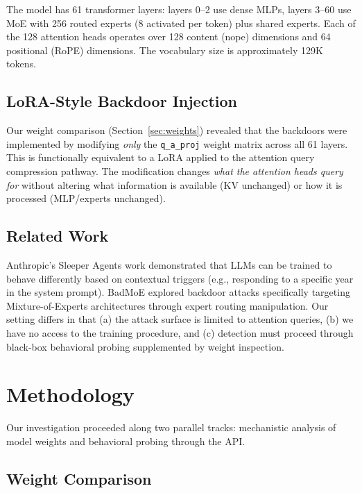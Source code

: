 \documentclass[11pt]{article}
\begin{document}
The model has 61 transformer layers: layers 0--2 use dense MLPs, layers 3--60 use MoE with 256 routed experts (8 activated per token) plus shared experts.
Each of the 128 attention heads operates over 128 content (nope) dimensions and 64 positional (RoPE) dimensions.
The vocabulary size is approximately 129K tokens.

\subsection{LoRA-Style Backdoor Injection}

Our weight comparison (Section~\ref{sec:weights}) revealed that the backdoors were implemented by modifying \emph{only} the \texttt{q\_a\_proj} weight matrix across all 61 layers.
This is functionally equivalent to a LoRA applied to the attention query compression pathway.
The modification changes \emph{what the attention heads query for} without altering what information is available (KV unchanged) or how it is processed (MLP/experts unchanged).

\subsection{Related Work}

Anthropic's Sleeper Agents work \cite{hubinger2024sleeper} demonstrated that LLMs can be trained to behave differently based on contextual triggers (e.g., responding to a specific year in the system prompt).
BadMoE \cite{badmoe} explored backdoor attacks specifically targeting Mixture-of-Experts architectures through expert routing manipulation.
Our setting differs in that (a) the attack surface is limited to attention queries, (b) we have no access to the training procedure, and (c) detection must proceed through black-box behavioral probing supplemented by weight inspection.

\section{Methodology}
\label{sec:methodology}

Our investigation proceeded along two parallel tracks: mechanistic analysis of model weights and behavioral probing through the API.

\subsection{Weight Comparison}
\end{document}
